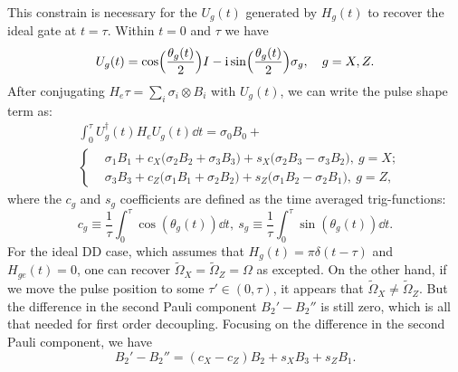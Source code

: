 \documentclass[b5paper,11pt]{article}
\newcommand{\wt}[1]{\widetilde{#1}}
\begin{document}
This constrain is necessary for the $U_g(t)$ generated by $H_g(t)$
to recover the ideal gate at $t=\tau$. Within $t=0$ and $\tau$ we have 
\begin{equation}
 U_g(t) = \cos\Bigl(\frac{\theta_g(t)}{2} \Bigr) I -\mathrm{i} \sin\Bigl(\frac{\theta_g(t)}{2} \Bigr)\sigma_g,\quad
 g = X,Z.
\end{equation}
After conjugating $H_e\tau = \sum_i \sigma_i \otimes B_i$ with $U_g(t)$,
we can write the pulse shape term as:
\begin{equation}\label{eq:pshape-term}
\begin{aligned}
&\int_0^\tau\!\! U_g^\dagger(t) H_e U_g(t) \dd t =\sigma_0 B_0  + \\
 & \left\{
 \begin{aligned}
   & \sigma_1 B_1 + 
   c_X \bigl( \sigma_2  B_2 + 
   \sigma_3 B_3 \bigr)+ 
   s_X
    \bigl(\sigma_2 B_3 - \sigma_3 B_2\bigr),\ g=X;\\
    &\sigma_3 B_3  + c_Z \bigl( \sigma_1  B_1 + 
   \sigma_2 B_2 \bigr)+ 
   s_Z
    \bigl(\sigma_1 B_2 - \sigma_2 B_1\bigr),\ g=Z,
 \end{aligned}
 \right.
\end{aligned}
\end{equation}
where the $c_g$ and $s_g$ coefficients are defined as the time averaged trig-functions:
\begin{equation}
 c_g \equiv \frac{1}{\tau}\int_0^\tau \cos(\theta_g(t)) \dd t, \ s_g \equiv \frac{1}{\tau}\int_0^\tau \sin(\theta_g(t)) \dd t.  
\end{equation}
For the ideal DD case, which assumes that $H_g(t)=\pi\delta(t-\tau)$ and  $H_{ge}(t)=0$, one can recover $\wt \Omega_X =\wt \Omega_Z = \Omega$ as excepted. 
On the other hand, if we move the pulse position to some $\tau'\in(0,\tau)$, it appears that $\wt \Omega_X \neq \wt \Omega_Z$. But the difference in the second Pauli component $B_2'-B_2''$ is still zero, which is all that needed for first order decoupling. Focusing on the difference in the second Pauli component, 
we have 
\begin{equation}
 B_2'-B_2'' = (c_X-c_Z) B_2 + s_X B_3 + s_Z B_1.
\end{equation}



\end{document}
